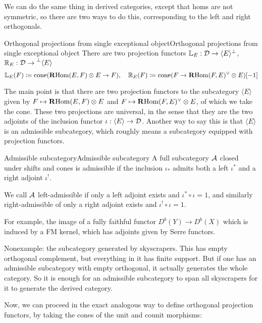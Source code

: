 We can do the same thing in derived categories, except that homs are not symmetric, so there are two ways to do this, corresponding to the left and right orthogonals.

\begin{definition}{Orthogonal projections from single exceptional object}{Orthogonal projections from single exceptional object}
    There are two projection functors $\mathbb{L}_E:\mathcal{D}\to\langle E\rangle ^\perp$, $\mathbb{R}_E:\mathcal{D}\to\prescript{\perp}{}{\langle} E\rangle$
    \begin{equation*}
        \mathbb{L}_E(F) \coloneqq \operatorname{cone}(\operatorname{\mathbf{R} Hom}(E,F)\otimes E \to F), \quad
        \mathbb{R}_E(F) \coloneqq \operatorname{cone}(F\to\operatorname{\mathbf{R} Hom}(F,E)^\lor\otimes E )[-1]
    \end{equation*}
\end{definition}

The main point is that there are two projection functors to the subcategory $\langle E \rangle$ given by $F\mapsto\operatorname{\mathbf{R} Hom}(E,F)\otimes E$ and $F\mapsto\operatorname{\mathbf{R} Hom}(F,E)^\lor\otimes E$, of which we take the cone. These two projections are universal, in the sense that they are the two adjoints of the inclusion functor $\iota:\langle E \rangle \to \mathcal{D}$. Another way to say this is that $\langle E \rangle$ is an admissible subcategory, which roughly means a subcategory equipped with projection functors.

\begin{definition}{Admissible subcategory}{Admissible subcategory}
    A full subcategory $\mathcal{A}$ closed under shifts and cones is admissible if the inclusion $\iota_*$ admits both a left $\iota^*$ and a right adjoint $\iota^!$.

    We call $\mathcal{A}$ left-admissible if only a left adjoint exists and $\iota^*\circ \iota=1$, and similarly right-admissible of only a right adjoint exists and $\iota^! \circ \iota=1$.
\end{definition}

For example, the image of a fully faithful functor $D^b(Y)\to D^b(X)$ which is induced by a FM kernel, which has adjoints given by Serre functors.

Nonexample: the subcategory generated by skyscrapers. This has empty orthogonal complement, but everything in it has finite support. But if one has an admissible subcategory with empty orthogonal, it actually generates the whole category. So it is enough for an admissible subcategory to span all skyscrapers for it to generate the derived category.

Now, we can proceed in the exact analogous way to define orthogonal projection functors, by taking the cones of the unit and counit morphisms:

